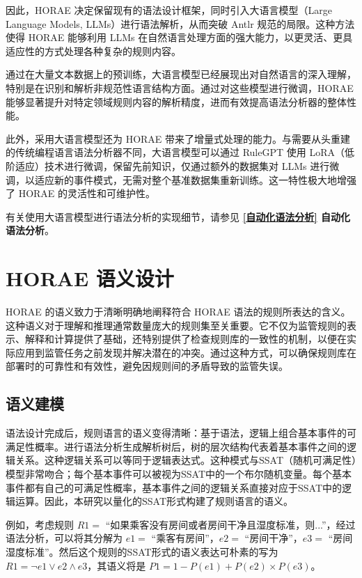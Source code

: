 因此，HORAE 决定保留现有的语法设计框架，同时引入大语言模型（Large Language Models, LLMs）进行语法解析，从而突破 Antlr 规范的局限。这种方法使得 HORAE 能够利用 LLMs 在自然语言处理方面的强大能力，以更灵活、更具适应性的方式处理各种复杂的规则内容。

通过在大量文本数据上的预训练，大语言模型已经展现出对自然语言的深入理解，特别是在识别和解析非规范性语言结构方面。通过对这些模型进行微调，HORAE 能够显著提升对特定领域规则内容的解析精度，进而有效提高语法分析器的整体性能。

此外，采用大语言模型还为 HORAE 带来了增量式处理的能力。与需要从头重建的传统编程语言语法分析器不同，大语言模型可以通过 RuleGPT 使用 LoRA（低阶适应）技术进行微调，保留先前知识，仅通过额外的数据集对 LLMs 进行微调，以适应新的事件模式，无需对整个基准数据集重新训练。这一特性极大地增强了 HORAE 的灵活性和可维护性。

有关使用大语言模型进行语法分析的实现细节，请参见 \textbf{\ref{自动化语法分析} 自动化语法分析}。

\newpage

\section{HORAE 语义设计}

HORAE 的语义致力于清晰明确地阐释符合 HORAE 语法的规则所表达的含义。这种语义对于理解和推理通常数量庞大的规则集至关重要。它不仅为监管规则的表示、解释和计算提供了基础，还特别提供了检查规则库的一致性的机制，以便在实际应用到监管任务之前发现并解决潜在的冲突。通过这种方式，可以确保规则库在部署时的可靠性和有效性，避免因规则间的矛盾导致的监管失误。

\subsection{语义建模}

语法设计完成后，规则语言的语义变得清晰：基于语法，逻辑上组合基本事件的可满足性概率。进行语法分析生成解析树后，树的层次结构代表着基本事件之间的逻辑关系。这种逻辑关系可以等同于逻辑表达式。这种模式与SSAT（随机可满足性）模型非常吻合；每个基本事件可以被视为SSAT中的一个布尔随机变量。每个基本事件都有自己的可满足性概率，基本事件之间的逻辑关系直接对应于SSAT中的逻辑运算。因此，本研究以量化的SSAT形式构建了规则语言的语义。

例如，考虑规则 $R1=$ “如果乘客没有房间或者房间干净且湿度标准，则...”，经过语法分析，可以将其分解为 $e1=$ “乘客有房间”，$e2=$ “房间干净”，$e3=$ “房间湿度标准”。然后这个规则的SSAT形式的语义表达可朴素的写为 $R1=\neg e1 \vee e2 \wedge e3$，其语义将是 $P1=1-P(e1)+P(e2)\times P(e3)$。

